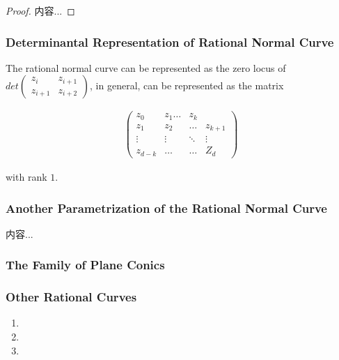 \documentclass[Total.tex]{subfiles}
\begin{document}
			\begin{proof}
				内容...
			\end{proof}
			
			
	
			
			
			\subsubsection{Determinantal Representation of Rational Normal Curve}
			
			\begin{Def}
				The rational normal curve can be represented as the zero locus of $det\begin{pmatrix}
					z_{i}&z_{i+1}\\
					z_{i+1}&z_{i+2}
				\end{pmatrix}$, in general, can be represented as the matrix
				
				\begin{gather*}
					\begin{pmatrix}
						z_0&z_1\dots&z_{k}\\
						z_1&z_2&\dots&z_{k+1}\\
						\vdots&\vdots&\ddots&\vdots\\
						z_{d-k}&\dots&\dots&Z_d
					\end{pmatrix}
				\end{gather*}
				
				with rank $1$.
			\end{Def}
			
			\subsubsection{Another Parametrization of the Rational Normal Curve}
			
			\begin{Def}
				内容...
			\end{Def}
			\subsubsection{The Family of Plane Conics}
			
			
			
			\subsubsection{Other Rational Curves}
			
			\begin{enumerate}
				\item 
				\item 
				
				\item 
			\end{enumerate}
			
\end{document}
